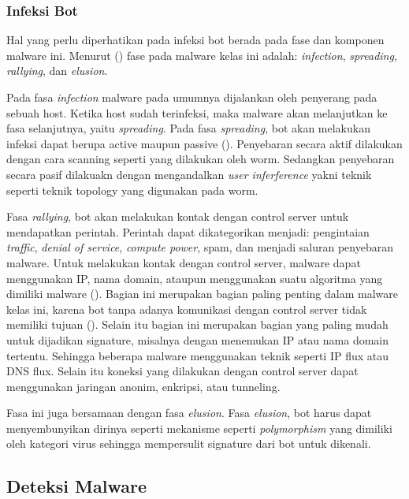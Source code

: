 \subsubsection{Infeksi Bot}

Hal yang perlu diperhatikan pada infeksi bot berada pada fase dan komponen malware ini. Menurut (\cite{alsamer2016}) fase pada malware kelas ini adalah: \textit{infection}, \textit{spreading}, \textit{rallying}, dan \textit{elusion}.

Pada fasa \textit{infection} malware pada umumnya dijalankan oleh penyerang pada sebuah host. Ketika host sudah terinfeksi, maka malware akan melanjutkan ke fasa selanjutnya, yaitu \textit{spreading}. Pada fasa \textit{spreading}, bot akan melakukan infeksi dapat berupa active maupun passive (\cite{alsamer2016}). Penyebaran secara aktif dilakukan dengan cara scanning seperti yang dilakukan oleh worm. Sedangkan penyebaran secara pasif dilakuakn dengan mengandalkan \textit{user inferference} yakni teknik seperti teknik topology yang digunakan pada worm.

Fasa \textit{rallying}, bot akan melakukan kontak dengan control server untuk mendapatkan perintah. Perintah dapat dikategorikan menjadi: pengintaian \textit{traffic}, \textit{denial of service}, \textit{compute power}, spam, dan menjadi saluran penyebaran malware. Untuk melakukan kontak dengan control server, malware dapat menggunakan IP, nama domain, ataupun menggunakan suatu algoritma yang dimiliki malware (\cite{alsamer2016}). Bagian ini merupakan bagian paling penting dalam malware kelas ini, karena bot tanpa adanya komunikasi dengan control server tidak memiliki tujuan (\cite{alsamer2016}). Selain itu bagian ini merupakan bagian yang paling mudah untuk dijadikan signature, misalnya dengan menemukan IP atau nama domain tertentu. Sehingga beberapa malware menggunakan teknik seperti IP flux atau DNS flux. Selain itu koneksi yang dilakukan dengan control server dapat menggunakan jaringan anonim, enkripsi, atau tunneling. 

Fasa ini juga bersamaan dengan fasa \textit{elusion}. Fasa \textit{elusion}, bot harus dapat menyembunyikan dirinya seperti mekanisme seperti \textit{polymorphism} yang dimiliki oleh kategori virus sehingga mempersulit signature dari bot untuk dikenali. 

\subsection{Deteksi Malware}

